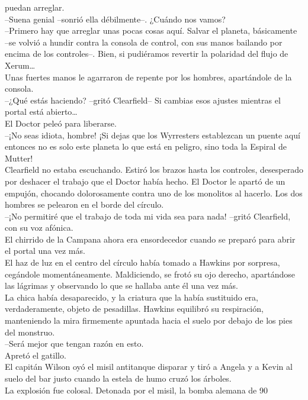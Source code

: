 puedan arreglar.\\
--Suena genial --sonrió ella débilmente--. ¿Cuándo nos vamos?\\
--Primero hay que arreglar unas pocas cosas aquí. Salvar el planeta,
básicamente --se volvió a hundir contra la consola de control, con sus
manos bailando por encima de los controles--. Bien, si pudiéramos
revertir la polaridad del flujo de Xerum\ldots{}\\
Unas fuertes manos le agarraron de repente por los hombres, apartándole
de la consola.\\
--¿Qué estás haciendo? --gritó Clearfield-- Si cambias esos ajustes
mientras el portal está abierto\ldots{}\\
El Doctor peleó para liberarse.\\
--¡No seas idiota, hombre! ¡Si dejas que los Wyrresters establezcan un
puente aquí entonces no es solo este planeta lo que está en peligro,
sino toda la Espiral de Mutter!\\
Clearfield no estaba escuchando. Estiró los brazos hasta los controles,
desesperado por deshacer el trabajo que el Doctor había hecho. El Doctor
le apartó de un empujón, chocando dolorosamente contra uno de los
monolitos al hacerlo. Los dos hombres se pelearon en el borde del
círculo.\\
--¡No permitiré que el trabajo de toda mi vida sea para nada! --gritó
Clearfield, con su voz afónica.\\
El chirrido de la Campana ahora era ensordecedor cuando se preparó para
abrir el portal una vez más.\\[2\baselineskip]El haz de luz en el centro
del círculo había tomado a Hawkins por sorpresa, cegándole
momentáneamente. Maldiciendo, se frotó su ojo derecho, apartándose las
lágrimas y observando lo que se hallaba ante él una vez más.\\
La chica había desaparecido, y la criatura que la había sustituido era,
verdaderamente, objeto de pesadillas. Hawkins equilibró su respiración,
manteniendo la mira firmemente apuntada hacia el suelo por debajo de los
pies del monstruo.\\
--Será mejor que tengan razón en esto.\\
Apretó el gatillo.\\[2\baselineskip]El capitán Wilson oyó el misil
antitanque disparar y tiró a Angela y a Kevin al suelo del bar justo
cuando la estela de humo cruzó los árboles.\\
La explosión fue colosal. Detonada por el misil, la bomba alemana de 90
